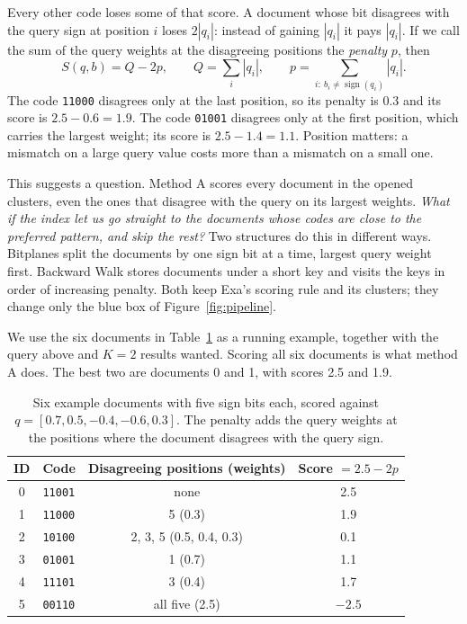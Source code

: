 Every other code loses some of that score. A document whose bit disagrees with the query
sign at position $i$ loses $2|q_i|$: instead of gaining $|q_i|$ it pays $|q_i|$. If we call
the sum of the query weights at the disagreeing positions the \emph{penalty} $p$, then
\begin{equation}
 S(q,b)=Q-2p,\qquad Q=\sum_i|q_i|,\qquad p=\sum_{i:\ b_i\ne\operatorname{sign}(q_i)}|q_i|.
 \label{eq:score}
\end{equation}
The code \texttt{11000} disagrees only at the last position, so its penalty is $0.3$ and its
score is $2.5-0.6=1.9$. The code \texttt{01001} disagrees only at the first position, which
carries the largest weight; its score is $2.5-1.4=1.1$. Position matters: a mismatch on a
large query value costs more than a mismatch on a small one.

This suggests a question. Method A scores every document in the opened clusters, even the
ones that disagree with the query on its largest weights. \emph{What if the index let us go
straight to the documents whose codes are close to the preferred pattern, and skip the
rest?} Two structures do this in different ways. Bitplanes split the documents by one sign
bit at a time, largest query weight first. Backward Walk stores documents under a short key
and visits the keys in order of increasing penalty. Both keep Exa's scoring rule and its
clusters; they change only the blue box of Figure~\ref{fig:pipeline}.

We use the six documents in Table~\ref{tab:toy} as a running example, together with the
query above and $K=2$ results wanted. Scoring all six documents is what method A does. The
best two are documents 0 and 1, with scores 2.5 and 1.9.

\begin{table}[H]\centering\small
\caption{Six example documents with five sign bits each, scored against
$q=[0.7,0.5,-0.4,-0.6,0.3]$. The penalty adds the query weights at the positions where the
document disagrees with the query sign.}
\label{tab:toy}
\begin{tabular}{@{}clcc@{}}\toprule
ID & Code & Disagreeing positions (weights) & Score $=2.5-2p$\\\midrule
0 & \texttt{11001} & none & 2.5\\
1 & \texttt{11000} & 5 (0.3) & 1.9\\
2 & \texttt{10100} & 2, 3, 5 (0.5, 0.4, 0.3) & 0.1\\
3 & \texttt{01001} & 1 (0.7) & 1.1\\
4 & \texttt{11101} & 3 (0.4) & 1.7\\
5 & \texttt{00110} & all five (2.5) & $-2.5$\\\bottomrule
\end{tabular}
\end{table}

